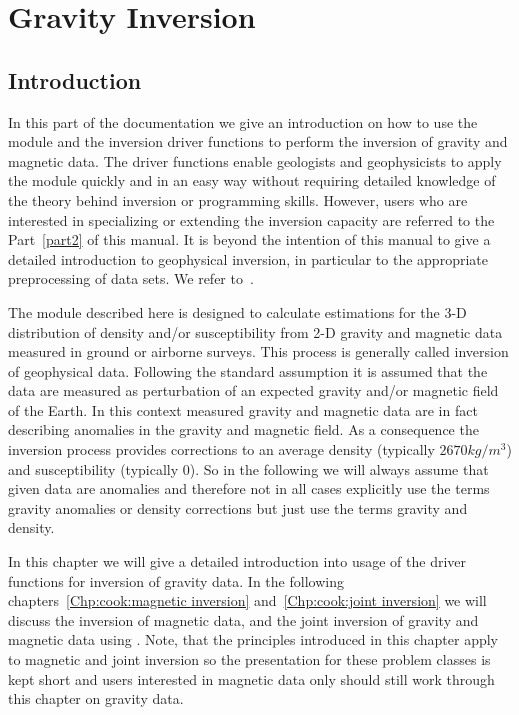 \chapter{Gravity Inversion}\label{Chp:cook:gravity inversion}

\section{Introduction}

In this part of the documentation we give an introduction on how to use the
\downunder module and the inversion driver functions to perform the inversion
of gravity and magnetic data.
The driver functions enable geologists and geophysicists to apply the
\downunder module quickly and in an easy way without requiring detailed
knowledge of the theory behind inversion or programming skills.
However, users who are interested in specializing or extending the inversion
capacity are referred to the Part~\ref{part2} of this manual.
It is beyond the intention of this manual to give a detailed introduction to
geophysical inversion, in particular to the appropriate preprocessing of data
sets. We refer to~\cite{REF1, REF2, REF3}.

The \downunder module described here is designed to calculate estimations for
the 3-D distribution of density and/or susceptibility from 2-D gravity and
magnetic data measured in ground or airborne surveys.
This process is generally called inversion of geophysical data.
Following the standard assumption it is assumed that the data are measured as
perturbation of an expected gravity and/or magnetic field of the Earth.
In this context measured gravity and magnetic data are in fact describing
anomalies in the gravity and magnetic field.
As a consequence the inversion process provides corrections to an average
density (typically $2670 kg/m^3$) and susceptibility (typically $0$).
So in the following we will always assume that given data are anomalies and
therefore not in all cases explicitly use the terms gravity anomalies or
density corrections but just use the terms gravity and density.

In this chapter we will give a detailed introduction into usage of the driver
functions for inversion of gravity data.
In the following chapters~\ref{Chp:cook:magnetic inversion} and~\ref{Chp:cook:joint inversion}
we will discuss the inversion of magnetic data, and the joint inversion of
gravity and magnetic data using \downunder.
Note, that the principles introduced in this chapter apply to magnetic and
joint inversion so the presentation for these problem classes is kept short
and users interested in magnetic data only should still work through this
chapter on gravity data. 

